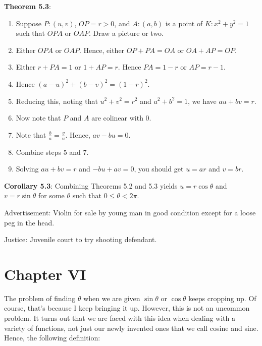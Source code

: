 \documentclass[english]{book}
\begin{document}
\textbf{Theorem 5.3}:
\begin{enumerate}[\hspace{1cm}1)]
  \item Suppose $P:(u,v)$, $OP=r>0$, and $A:(a,b)$ is a point of $K:x^{2}+y^{2}=1$ such that $OPA$ or $OAP$. Draw a picture or two.
  \item Either $OPA$ or $OAP$. Hence, either $OP+PA=OA$ or $OA+AP=OP$.
  \item Either $r+PA=1$ or $1+AP=r$. Hence $PA=1-r$ or $AP=r-1$.
  \item Hence $(a-u)^{2} + (b-v)^{2} = (1-r)^{2}$.
  \item Reducing this, noting that $u^{2}+v^{2}=r^{2}$ and $a^{2}+b^{2}=1$, we have $au+bv=r$.
  \item Now note that $P$ and $A$ are colinear with $0$.
  \item Note that $\frac{b}{a} = \frac{v}{u}$. Hence, $av-bu=0$.
  \item Combine steps 5 and 7.
  \item Solving $au+bv=r$ and $-bu+av=0$, you should get $u=ar$ and $v=br$.
\end{enumerate}

\textbf{Corollary 5.3}: Combining Theorems 5.2 and 5.3 yields $u = r \cos \theta$ and $v = r \sin \theta$ for some $\theta$ such that $0 \leq \theta < 2\pi$.


\vspace{2cm}

\begin{center}
Advertisement: Violin for sale by young man in good condition except for a loose peg in the head.
\vspace{0.5cm}

Justice: Juvenile court to try shooting defendant.
\end{center}


\chapter*{Chapter VI}

The problem of finding $\theta$ when we are given $\sin \theta$ or $\cos \theta$ keeps cropping up. Of course, that's because I keep bringing it up. However, this is not an uncommon problem. It turns out that we are faced with this idea when dealing with a variety of functions, not just our newly invented ones that we call cosine and sine. Hence, the following definition:
\end{document}
